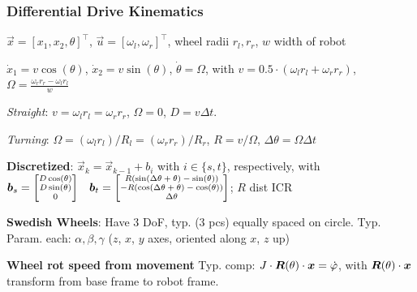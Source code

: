\subsubsection{Differential Drive Kinematics}
\label{sec:diff-drive-kin}

 $\vec{x} = [x_1, x_2, \theta]^\top$,
 $\vec{u} = [\omega_l, \omega_r]^\top$, wheel radii $r_l, r_r$, $w$ width of robot

 $\dot{x}_1 = v\cos(\theta)$, $\dot{x}_2 = v\sin(\theta)$, $\dot{\theta} = \Omega$,
with $v = 0.5\cdot(\omega_l r_l + \omega_r r_r)$, $\Omega = \frac{\omega_r r_r - \omega_l r_l}{w}$

\textit{Straight}: $v = \omega_l r_l = \omega_r r_r$, $\Omega = 0$, $D = v\Delta t$.

\textit{Turning}: $\Omega = (\omega_l r_l) / R_l\! =\! (\omega_r r_r) / R_r$, $R\! =\! v / \Omega$, $\Delta \theta\! =\! \Omega \Delta t$

\textbf{Discretized}: $\vec{x}_k = \vec{x}_{k - 1} + b_i$ with $i \in \{s, t\}$, respectively, with
$\vec{b}_s = {\scriptsize \begin{bmatrix}
        D \cos(\theta) \\
        D \sin(\theta) \\
        0
    \end{bmatrix}}
    \quad \vec{b}_t = {\scriptsize \begin{bmatrix}
        R(\sin(\Delta \theta + \theta) - \sin(\theta))  \\
        -R(\cos(\Delta \theta + \theta) - \cos(\theta)) \\
        \Delta \theta
    \end{bmatrix}}$; $R$ dist ICR

\textbf{Swedish Wheels}: Have 3 DoF, typ. (3 pcs) equally spaced on circle.
Typ. Param. each: $\alpha, \beta, \gamma$ ($z$, $x$, $y$ axes, oriented along $x$, $z$ up)

\textbf{Wheel rot speed from movement} Typ. comp: $J \cdot \mat{R}(\theta) \cdot \vec{x} = \dot{\varphi}$,
with $\mat{R}(\theta) \cdot \vec{x}$ transform from base frame to robot frame.
